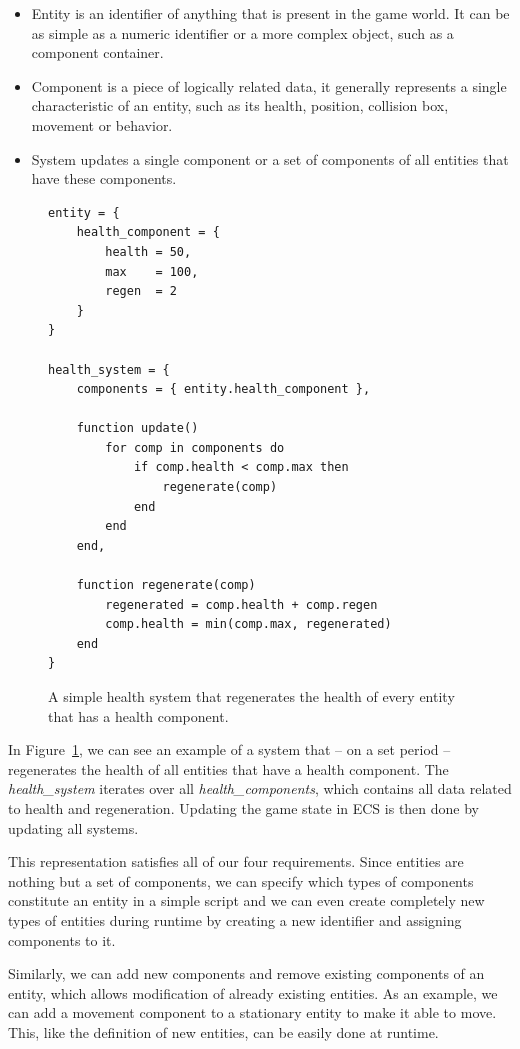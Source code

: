 \begin{itemize}
    \item Entity is an identifier of anything that is present in the game world. It can be as simple as a numeric 
        identifier or a more complex object, such as a component container.
    \item Component is a piece of logically related data, it generally represents a single characteristic 
        of an entity, such as its health, position, collision box, movement or behavior.
    \item System updates a single component or a set of components of all entities that have these components.
\end{itemize}

\begin{figure}[h]
    \centering
    \begin{lstlisting}
entity = {
    health_component = {
        health = 50,
        max    = 100,
        regen  = 2
    }
}

health_system = {
    components = { entity.health_component },

    function update()
        for comp in components do
            if comp.health < comp.max then
                regenerate(comp)
            end
        end
    end,

    function regenerate(comp)
        regenerated = comp.health + comp.regen
        comp.health = min(comp.max, regenerated)
    end
}
    \end{lstlisting}
    \caption{A simple health system that regenerates the health of every entity
            that has a health component.}
    \label{ecs-example}
\end{figure}

In Figure~\ref{ecs-example}, we can see an example of a system that -- on a set period -- regenerates the health of all entities
that have a health component. The \emph{health\_system} iterates over all \emph{health\_components}, which contains all
data related to health and regeneration. Updating the game state in ECS is then done by updating all systems.

This representation satisfies all of our four requirements. Since entities are nothing but a set of components, we can specify
which types of components constitute an entity in a simple script and we can even create completely new types of entities
during runtime by creating a new identifier and assigning components to it.

Similarly, we can add new components and remove existing components of an entity, which allows modification of already existing
entities. As an example, we can add a movement component to a stationary entity to make it able to move. This, like the definition
of new entities, can be easily done at runtime.

